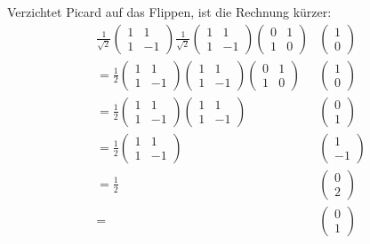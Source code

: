 Verzichtet Picard auf das Flippen, ist die Rechnung kürzer:
\begin{align}
    \frac{1}{\sqrt{2}}
    \begin{pmatrix}
        1 & 1 \\
        1 & -1
    \end{pmatrix}
    \frac{1}{\sqrt{2}}
    \begin{pmatrix}
        1 & 1 \\
        1 & -1
    \end{pmatrix}
    \begin{pmatrix}
        0 & 1 \\
        1 & 0
    \end{pmatrix} 
    &\begin{pmatrix}
        1 \\
        0
    \end{pmatrix} \\
    =
    \frac{1}{2}
    \begin{pmatrix}
        1 & 1 \\
        1 & -1
    \end{pmatrix}
    \begin{pmatrix}
        1 & 1 \\
        1 & -1
    \end{pmatrix}
    \begin{pmatrix}
        0 & 1 \\
        1 & 0
    \end{pmatrix} 
    &\begin{pmatrix}
        1 \\
        0
    \end{pmatrix} \\
    =
    \frac{1}{2}
    \begin{pmatrix}
        1 & 1 \\
        1 & -1
    \end{pmatrix}
    \begin{pmatrix}
        1 & 1 \\
        1 & -1
    \end{pmatrix}
    &\begin{pmatrix}
        0 \\
        1
    \end{pmatrix} \\
    =
    \frac{1}{2}
    \begin{pmatrix}
        1 & 1 \\
        1 & -1
    \end{pmatrix}
    &\begin{pmatrix}
        1 \\
        -1
    \end{pmatrix} \\
    =
    \frac{1}{2}
    &\begin{pmatrix}
        0 \\
        2
    \end{pmatrix} \\
    =
    &\begin{pmatrix}
        0 \\
        1
    \end{pmatrix}
\end{align}

